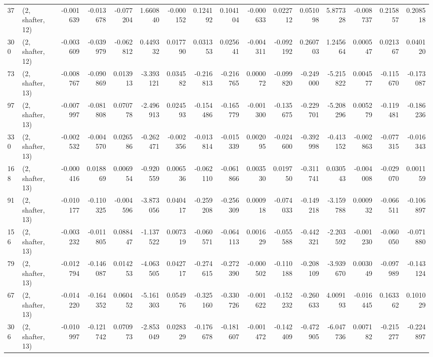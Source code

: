 \begin{tabular}{llrrrrrrrrrrrrrr}
37  &  (2, shafter, 12) &  -0.001639 & -0.013678 & -0.077204 &    1.660840 & -0.000152 &   0.124192 &  0.104104 & -0.000633 &  0.022712 &  0.051098 &    5.877328 & -0.008737 &  0.215857 &  0.208518 \\
300 &  (2, shafter, 12) &  -0.003609 & -0.039979 & -0.062812 &    0.449332 &  0.017790 &   0.031353 &  0.025641 & -0.004311 & -0.092192 &  0.260703 &    1.245664 &  0.000547 &  0.021367 &  0.040120 \\
73  &  (2, shafter, 13) &  -0.008767 & -0.090869 &  0.013913 &   -3.393121 &  0.034582 &  -0.216813 & -0.216765 &  0.000072 & -0.099820 & -0.249000 &   -5.215822 &  0.004577 & -0.115670 & -0.173087 \\
97  &  (2, shafter, 13) &  -0.007997 & -0.081808 &  0.070778 &   -2.496913 &  0.024593 &  -0.154486 & -0.165779 & -0.001300 & -0.135675 & -0.229701 &   -5.208296 &  0.005279 & -0.119481 & -0.186236 \\
330 &  (2, shafter, 13) &  -0.002532 & -0.004570 &  0.026586 &   -0.262471 & -0.002356 &  -0.013814 & -0.015339 &  0.002095 & -0.024600 & -0.392998 &   -0.413152 & -0.002863 & -0.077315 & -0.016343 \\
168 &  (2, shafter, 13) &  -0.000416 &  0.018869 &  0.006954 &   -0.920559 &  0.006536 &  -0.062110 & -0.061866 &  0.003530 &  0.019750 & -0.311741 &    0.030543 & -0.004008 & -0.029070 &  0.001159 \\
91  &  (2, shafter, 13) &  -0.010177 & -0.110325 & -0.004596 &   -3.873056 &  0.040417 &  -0.259208 & -0.256309 &  0.000918 & -0.074033 & -0.149218 &   -3.159788 &  0.000932 & -0.066511 & -0.106897 \\
156 &  (2, shafter, 13) &  -0.003232 & -0.011805 &  0.088447 &   -1.137522 &  0.007319 &  -0.060571 & -0.064113 &  0.001629 & -0.055588 & -0.442321 &   -2.203592 & -0.001230 & -0.060050 & -0.071880 \\
79  &  (2, shafter, 13) &  -0.012794 & -0.146087 &  0.014253 &   -4.063505 &  0.042717 &  -0.274615 & -0.272390 & -0.000502 & -0.110188 & -0.208109 &   -3.939670 &  0.003049 & -0.097989 & -0.143124 \\
67  &  (2, shafter, 13) &  -0.014220 & -0.164352 &  0.060452 &   -5.161303 &  0.054976 &  -0.325160 & -0.330726 & -0.001622 & -0.152232 & -0.260633 &    4.009193 & -0.016445 &  0.163362 &  0.101029 \\
306 &  (2, shafter, 13) &  -0.010997 & -0.121742 &  0.070973 &   -2.853049 &  0.028329 &  -0.176678 & -0.181607 & -0.001472 & -0.142409 & -0.472905 &   -6.047736 &  0.007182 & -0.215277 & -0.224897 \\

\end{tabular}
